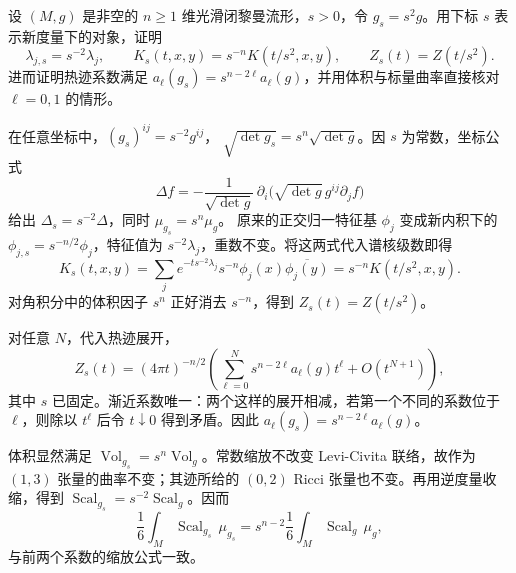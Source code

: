 \begin{exercise}\label{g3:ex:heat-metric-scaling}
	设 \((M,g)\) 是非空的 \(n\ge1\) 维光滑闭黎曼流形，\(s>0\)，令 \(g_s=s^2g\)。用下标 \(s\) 表示新度量下的对象，证明
	\[
		\lambda_{j,s}=s^{-2}\lambda_j,\qquad
		K_s(t,x,y)=s^{-n}K(t/s^2,x,y),\qquad
		Z_s(t)=Z(t/s^2).
	\]
	进而证明热迹系数满足 \(a_\ell(g_s)=s^{n-2\ell}a_\ell(g)\)，并用体积与标量曲率直接核对 \(\ell=0,1\) 的情形。
\end{exercise}
\begin{solution}
	在任意坐标中，\((g_s)^{ij}=s^{-2}g^{ij}\)，
	\(\sqrt{\det g_s}=s^n\sqrt{\det g}\)。因 \(s\) 为常数，坐标公式
	\[
		\Delta f=-\frac1{\sqrt{\det g}}\,
		\partial_i\bigl(\sqrt{\det g}\,g^{ij}\partial_jf\bigr)
	\]
	给出 \(\Delta_s=s^{-2}\Delta\)，同时 \(\mu_{g_s}=s^n\mu_g\)。
	原来的正交归一特征基 \(\phi_j\) 变成新内积下的
	\(\phi_{j,s}=s^{-n/2}\phi_j\)，特征值为 \(s^{-2}\lambda_j\)，重数不变。将这两式代入谱核级数即得
	\[
		K_s(t,x,y)=\sum_j e^{-t s^{-2}\lambda_j}
		s^{-n}\phi_j(x)\overline{\phi_j(y)}
		=s^{-n}K(t/s^2,x,y).
	\]
	对角积分中的体积因子 \(s^n\) 正好消去 \(s^{-n}\)，得到 \(Z_s(t)=Z(t/s^2)\)。

	对任意 \(N\)，代入热迹展开，
	\[
		Z_s(t)=(4\pi t)^{-n/2}
		\left(\sum_{\ell=0}^N s^{n-2\ell}a_\ell(g)t^\ell
		+O(t^{N+1})\right),
	\]
	其中 \(s\) 已固定。渐近系数唯一：两个这样的展开相减，若第一个不同的系数位于 \(\ell\)，则除以 \(t^\ell\) 后令 \(t\downarrow0\) 得到矛盾。因此 \(a_\ell(g_s)=s^{n-2\ell}a_\ell(g)\)。

	体积显然满足 \(\operatorname{Vol}_{g_s}=s^n\operatorname{Vol}_g\)。常数缩放不改变 Levi-Civita 联络，故作为 \((1,3)\) 张量的曲率不变；其迹所给的 \((0,2)\) Ricci 张量也不变。再用逆度量收缩，得到
	\(\operatorname{Scal}_{g_s}=s^{-2}\operatorname{Scal}_g\)。因而
	\[
		\frac16\int_M\operatorname{Scal}_{g_s}\,\mu_{g_s}
		=s^{n-2}\frac16\int_M\operatorname{Scal}_g\,\mu_g,
	\]
	与前两个系数的缩放公式一致。
\end{solution}

